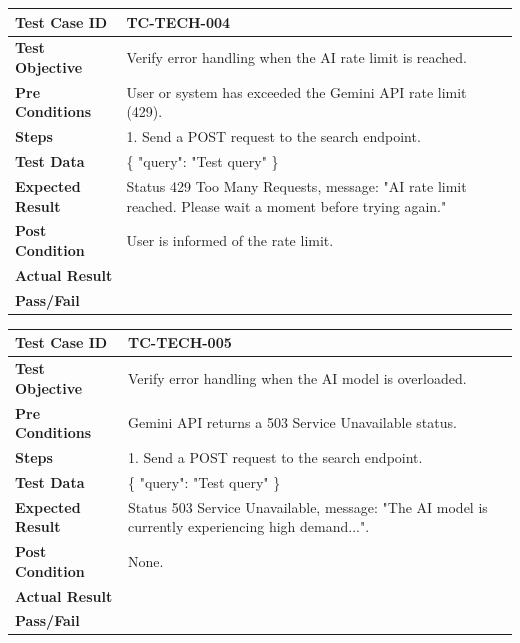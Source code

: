 \begin{longtable}{|p{}|p{}|}
\hline
\textbf{Test Case ID} & TC-TECH-004 \\ \hline
\textbf{Test Objective} & Verify error handling when the AI rate limit is reached. \\ \hline
\textbf{Pre Conditions} & User or system has exceeded the Gemini API rate limit (429). \\ \hline
\textbf{Steps} & 
1. Send a POST request to the search endpoint. \\ \hline
\textbf{Test Data} & \{ "query": "Test query" \} \\ \hline
\textbf{Expected Result} & Status 429 Too Many Requests, message: "AI rate limit reached. Please wait a moment before trying again." \\ \hline
\textbf{Post Condition} & User is informed of the rate limit. \\ \hline
\textbf{Actual Result} &  \\ \hline
\textbf{Pass/Fail} &  \\ \hline
\end{longtable}

\begin{longtable}{|p{}|p{}|}
\hline
\textbf{Test Case ID} & TC-TECH-005 \\ \hline
\textbf{Test Objective} & Verify error handling when the AI model is overloaded. \\ \hline
\textbf{Pre Conditions} & Gemini API returns a 503 Service Unavailable status. \\ \hline
\textbf{Steps} & 
1. Send a POST request to the search endpoint. \\ \hline
\textbf{Test Data} & \{ "query": "Test query" \} \\ \hline
\textbf{Expected Result} & Status 503 Service Unavailable, message: "The AI model is currently experiencing high demand...". \\ \hline
\textbf{Post Condition} & None. \\ \hline
\textbf{Actual Result} &  \\ \hline
\textbf{Pass/Fail} &  \\ \hline
\end{longtable}

